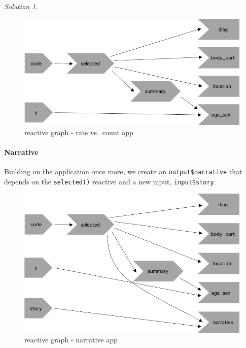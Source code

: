 \documentclass[
]{book}
\theoremstyle{definition}
\theoremstyle{definition}
\theoremstyle{definition}
\theoremstyle{definition}
\theoremstyle{remark}
\newtheorem*{solution}{Solution}
\begin{document}
\begin{solution}
\begin{figure}
\centering
\includegraphics[width=5.20833in,height=\textheight]{images/5.8.1-ratecount.png}
\caption{reactive graph - rate vs.~count app}
\end{figure}

\hypertarget{narrative}{%
\paragraph*{Narrative}\label{narrative}}

Building on the application once more, we create an \texttt{output\$narrative} that
depends on the \texttt{selected()} reactive and a new input, \texttt{input\$story}.

\begin{figure}
\centering
\includegraphics[width=5.20833in,height=\textheight]{images/5.8.1-narrative.png}
\caption{reactive graph - narrative app}
\end{figure}

\end{solution}
\end{document}
